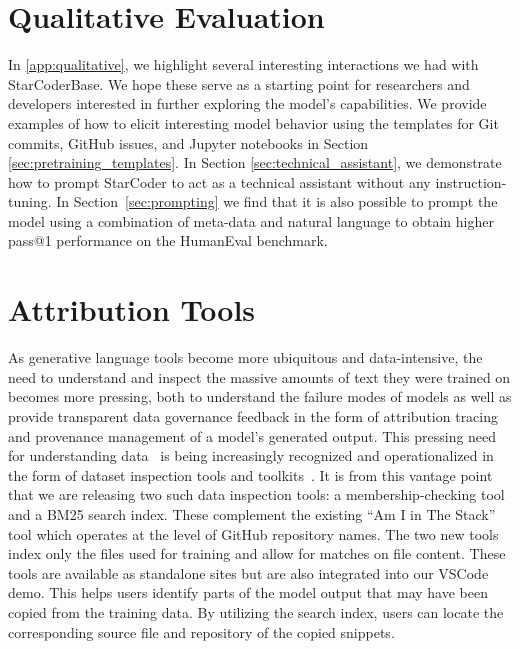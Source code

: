 \section{Qualitative Evaluation}
\lstset{basicstyle=\footnotesize\ttfamily}
In \autoref{app:qualitative}, we highlight several interesting interactions we had with StarCoderBase. We hope these serve as a  starting point for researchers and developers interested in further exploring the model's capabilities. We provide examples of how to elicit interesting model behavior using the templates for Git commits, GitHub issues, and Jupyter notebooks in Section \ref{sec:pretraining_templates}. In Section \ref{sec:technical_assistant}, we demonstrate how to prompt StarCoder to act as a technical assistant without any instruction-tuning. In Section~\ref{sec:prompting} we find that it is also possible to prompt the model using a combination of meta-data and natural language to obtain higher pass@1 performance on the HumanEval benchmark.

\section{Attribution Tools}\label{sec:attribution_tool}
As generative language tools become more ubiquitous and data-intensive, the need to understand and inspect the massive amounts of text they were trained on becomes more pressing, both to understand the failure modes of models as well as provide transparent data governance feedback in the form of attribution tracing and provenance management of a model's generated output. This pressing need for understanding data~\citep{mitchell-measuring-data} is being increasingly recognized and operationalized in the form of dataset inspection tools and toolkits~\citep{akiki-spacerini-search,marone-data-portraits-search,piktus-roots-search}. It is from this vantage point that we are releasing two such data inspection tools: a membership-checking tool and a BM25 search index. These complement the existing ``Am I in The Stack'' tool which operates at the level of GitHub repository names. The two new tools index only the files used for training and allow for matches on file content. These tools are available as standalone sites but are also integrated into our VSCode demo. This helps users identify parts of the model output that may have been copied from the training data. By utilizing the search index, users can locate the corresponding source file and repository of the copied snippets. 

